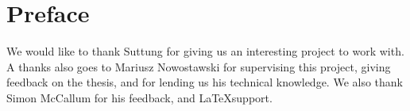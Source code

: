 \chapter*{Preface} %
\label{chap:preface}
We would like to thank Suttung for giving us an interesting project to work
with. A thanks also goes to Mariusz Nowostawski for supervising this project,
giving feedback on the thesis, and for lending us his technical knowledge.
We also thank Simon McCallum for his feedback, and \LaTeX support.

